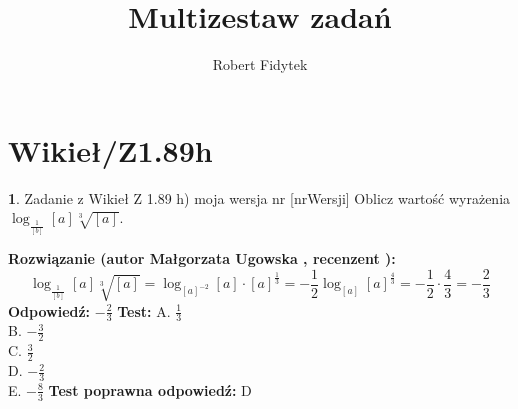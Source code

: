 \documentclass[12pt, a4paper]{article}
\title{Multizestaw zadań}
\author{Robert Fidytek}
\date{}
\theoremstyle{definition} %
\newtheorem{zad}{}
\newcommand{\kategoria}[1]{\section{#1}} %
\newcommand{\zadStart}[1]{\begin{zad}#1\newline} %
\newcommand{\zadStop}{\end{zad}}   %
\newcommand{\rozwStart}[2]{\noindent \textbf{Rozwiązanie (autor #1 , recenzent #2): }\newline} %
\newcommand{\rozwStop}{\newline}                                            %
\newcommand{\odpStart}{\noindent \textbf{Odpowiedź:}\newline}    %
\newcommand{\odpStop}{\newline}                                             %
\newcommand{\testStart}{\noindent \textbf{Test:}\newline} %
\newcommand{\testStop}{\newline} %
\newcommand{\kluczStart}{\noindent \textbf{Test poprawna odpowiedź:}\newline} %
\newcommand{\kluczStop}{\newline} %
\begin{document}
\maketitle


\kategoria{Wikieł/Z1.89h}
\zadStart{Zadanie z Wikieł Z 1.89 h) moja wersja nr [nrWersji]}
Oblicz warto\'sć wyrażenia $\log_{\frac{1}{[b]}}{[a]\sqrt[3]{[a]}}$.
\zadStop
\rozwStart{Małgorzata Ugowska}{}
$$\log_{\frac{1}{[b]}}{[a]\sqrt[3]{[a]}} = \log_{[a]^{-2}}{[a] \cdot [a]^{\frac{1}{3}}} = -\frac{1}{2}\log_{[a]}{[a]^{\frac{4}{3}}}  = -\frac{1}{2} \cdot \frac{4}{3}= -\frac{2}{3} $$
\rozwStop
\odpStart
$-\frac{2}{3}$
\odpStop
\testStart
A. $\frac{1}{3}$\\
B. $-\frac{3}{2}$\\
C. $\frac{3}{2}$\\
D. $-\frac{2}{3}$\\
E. $-\frac{8}{3}$
\testStop
\kluczStart
D
\kluczStop
\end{document}
